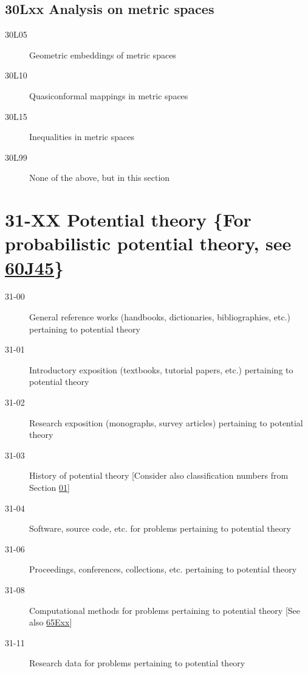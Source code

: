 \documentclass[letterpaper]{article}
\begin{document}
\subsection*{30Lxx  Analysis on metric spaces }\label{30Lxx}
\begin{description}  
\item [30L05]\label{30L05} Geometric embeddings of metric spaces
\item [30L10]\label{30L10} Quasiconformal mappings in metric spaces
\item [30L15]\label{30L15} Inequalities in metric spaces
\item [30L99]\label{30L99} None of the above, but in this section
\end{description}
\section*{31-XX Potential theory \{For probabilistic potential theory, see \hyperref[60J45]{60J45}\} }\label{31-XX}
\begin{description}
\item [31-00]\label{31-00} General reference works (handbooks, dictionaries, bibliographies, etc.) pertaining to potential theory
\item [31-01]\label{31-01} Introductory exposition (textbooks, tutorial papers, etc.) pertaining to potential theory
\item [31-02]\label{31-02} Research exposition (monographs, survey articles) pertaining to potential theory
\item [31-03]\label{31-03} History of potential theory [Consider also classification numbers from Section \hyperref[01-XX]{01}]
\item [31-04]\label{31-04} Software, source code, etc. for problems pertaining to potential theory
\item [31-06]\label{31-06} Proceedings, conferences, collections, etc. pertaining to potential theory
\item [31-08]\label{31-08} Computational methods for problems pertaining to potential theory [See also \hyperref[65Exx]{65Exx}]
\item [31-11]\label{31-11} Research data for problems pertaining to potential theory
\end{description}
\end{document}
